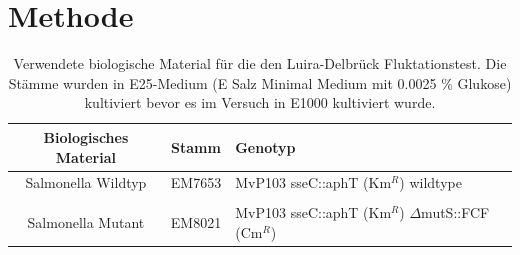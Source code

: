 \documentclass[oneside,10pt,a4paper]{report}
\begin{document}
		\section{Methode}
			\begin{table}[H]
			\centering
			\caption{Verwendete biologische Material für die den Luira-Delbrück Fluktationstest. Die Stämme wurden in E25-Medium (E Salz Minimal Medium mit 0.0025 $\%$ Glukose) kultiviert bevor es im Versuch in E1000 kultiviert wurde.}
			\label{tab: exp4-biologisches Material}
			\begin{tabular}{ccp{7.5cm}}
				\toprule
				Biologisches Material& Stamm & Genotyp\\
				\midrule
				\multirow{2}{*}{\parbox[t]{2cm}{Salmonella Wildtyp}}  & \multirow{2}{*}{EM7653} & \multirow{2}{*}{MvP103 sseC::aphT (Km$^R$) wildtype}\\
				&&\\
				&&\\
				\multirow{3}{*}{\parbox[t]{2cm}{Salmonella Mutant}} & \multirow{3}{*}{EM8021} &\multirow{3}{*}{MvP103 sseC::aphT (Km$^R$) $\Delta$mutS::FCF (Cm$^R$)} \\
				&&\\
				&&\\
				
				\bottomrule			
			\end{tabular}
		\end{table}
		
		
\end{document}
